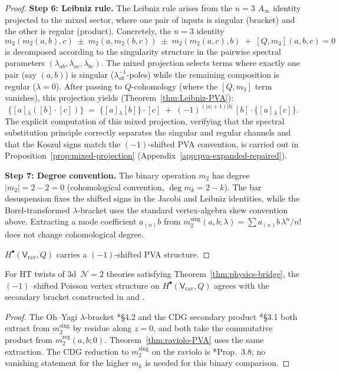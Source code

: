 \begin{proof}
\medskip\noindent\textbf{Step 6: Leibniz rule.}
The Leibniz rule arises from the $n=3$ $A_\infty$ identity projected to the mixed sector, where one pair of inputs is singular (bracket) and the other is regular (product). Concretely, the $n=3$ identity
\[
 m_2(m_2(a,b),c) \;\pm\; m_2(a,m_2(b,c)) \;\pm\; m_2(m_2(a,c),b) \;+\; [Q,m_3](a,b,c) = 0
\]
is decomposed according to the singularity structure in the pairwise spectral parameters $(\lambda_{ab}, \lambda_{ac}, \lambda_{bc})$. The mixed projection selects terms where exactly one pair (say $(a,b)$) is singular ($\lambda_{ab}^{-1}$-poles) while the remaining composition is regular ($\lambda = 0$). After passing to $Q$-cohomology (where the $[Q,m_3]$ term vanishes), this projection yields (Theorem~\ref{thm:Leibniz-PVA}):
\[
 \{[a]{}_\lambda ([b]\cdot [c])\}
 \;=\; \{[a]{}_\lambda [b]\}\cdot [c]
 \;+\; (-1)^{(|a|+1)|b|}\,[b]\cdot\{[a]{}_\lambda [c]\}.
\]
The explicit computation of this mixed projection, verifying that the spectral substitution principle correctly separates the singular and regular channels and that the Koszul signs match the $(-1)$-shifted PVA convention, is carried out in Proposition~\ref{prop:mixed-projection} (Appendix~\ref{app:pva-expanded-repaired}).

\medskip\noindent\textbf{Step 7: Degree convention.}
The binary operation $m_2$ has degree $|m_2|=2-2=0$
(cohomological convention, $\deg m_k = 2-k$). The bar
desuspension fixes the shifted signs in the Jacobi and Leibniz
identities, while the Borel-transformed $\lambda$-bracket uses the
standard vertex-algebra skew convention above. Extracting a mode
coefficient $a_{(n)}b$ from
$m_2^{\mathrm{sing}}(a,b;\lambda)=\sum a_{(n)}b\,\lambda^n/n!$
does not change cohomological degree.

\medskip
$H^\bullet(\mathsf{V}_{\mathrm{rav}}, Q)$ carries a $(-1)$-shifted PVA structure.
\end{proof}

\begin{corollary}
\label{cor:compatibility-OY-CDG}
For HT twists of $3$d~$\mathcal N=2$ theories satisfying Theorem~\ref{thm:physics-bridge},
the $(-1)$–shifted Poisson vertex structure on $H^\bullet(\mathsf V_{\mathrm{rav}},Q)$
agrees with the secondary bracket constructed in
\cite{OY20} and \cite{CDG20}.
\end{corollary}

\begin{proof}
The Oh--Yagi $\lambda$-bracket \cite{OY20}*{\S4.2} and the CDG
secondary product \cite{CDG20}*{\S3.1} both extract from
$m_2^{\mathrm{sing}}$ by residue along $z = 0$, and both take the
commutative product from $m_2^{\mathrm{reg}}(a,b;0)$.
Theorem~\ref{thm:raviolo-PVA} uses the same extraction.
The CDG reduction to $m_2^{\mathrm{sing}}$ on the raviolo is
\cite{CDG20}*{Prop.~3.8};
no vanishing statement for the higher $m_k$ is needed for this
binary comparison.
\end{proof}

